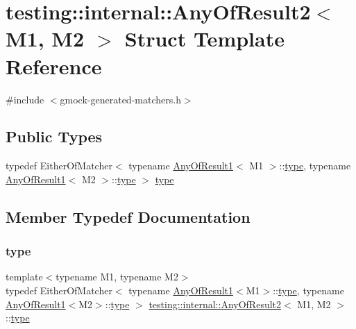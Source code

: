 \hypertarget{structtesting_1_1internal_1_1_any_of_result2}{}\section{testing\+::internal\+::Any\+Of\+Result2$<$ M1, M2 $>$ Struct Template Reference}
\label{structtesting_1_1internal_1_1_any_of_result2}


{\ttfamily \#include $<$gmock-\/generated-\/matchers.\+h$>$}

\subsection*{Public Types}
\begin{DoxyCompactItemize}
\item 
typedef Either\+Of\+Matcher$<$ typename \mbox{\hyperlink{structtesting_1_1internal_1_1_any_of_result1}{Any\+Of\+Result1}}$<$ M1 $>$\+::\mbox{\hyperlink{structtesting_1_1internal_1_1_any_of_result2_a6d9eba508021f8e652c7c154a649073f}{type}}, typename \mbox{\hyperlink{structtesting_1_1internal_1_1_any_of_result1}{Any\+Of\+Result1}}$<$ M2 $>$\+::\mbox{\hyperlink{structtesting_1_1internal_1_1_any_of_result2_a6d9eba508021f8e652c7c154a649073f}{type}} $>$ \mbox{\hyperlink{structtesting_1_1internal_1_1_any_of_result2_a6d9eba508021f8e652c7c154a649073f}{type}}
\end{DoxyCompactItemize}


\subsection{Member Typedef Documentation}
\mbox{\label{structtesting_1_1internal_1_1_any_of_result2_a6d9eba508021f8e652c7c154a649073f}} 
\subsubsection{\texorpdfstring{type}{type}}
{\footnotesize\ttfamily template$<$typename M1, typename M2$>$ \\
typedef Either\+Of\+Matcher$<$ typename \mbox{\hyperlink{structtesting_1_1internal_1_1_any_of_result1}{Any\+Of\+Result1}}$<$M1$>$\+::\mbox{\hyperlink{structtesting_1_1internal_1_1_any_of_result2_a6d9eba508021f8e652c7c154a649073f}{type}}, typename \mbox{\hyperlink{structtesting_1_1internal_1_1_any_of_result1}{Any\+Of\+Result1}}$<$M2$>$\+::\mbox{\hyperlink{structtesting_1_1internal_1_1_any_of_result2_a6d9eba508021f8e652c7c154a649073f}{type}} $>$ \mbox{\hyperlink{structtesting_1_1internal_1_1_any_of_result2}{testing\+::internal\+::\+Any\+Of\+Result2}}$<$ M1, M2 $>$\+::\mbox{\hyperlink{structtesting_1_1internal_1_1_any_of_result2_a6d9eba508021f8e652c7c154a649073f}{type}}}



